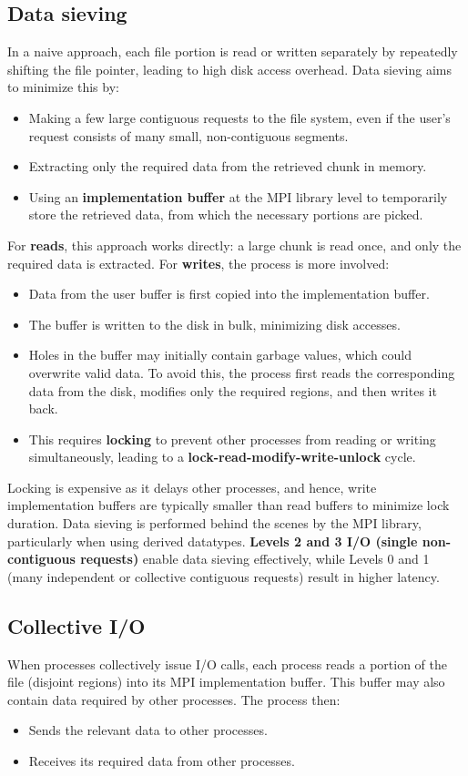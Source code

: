 \documentclass[12pt]{book}
\begin{document}
\subsection{Data sieving}
In a naive approach, each file portion is read or written separately by repeatedly shifting the file pointer, leading to high disk access overhead. Data sieving aims to minimize this by:
\begin{itemize}
    \item Making a few large contiguous requests to the file system, even if the user's request consists of many small, non-contiguous segments.
    \item Extracting only the required data from the retrieved chunk in memory.
    \item Using an \textbf{implementation buffer} at the MPI library level to temporarily store the retrieved data, from which the necessary portions are picked.
\end{itemize}

For \textbf{reads}, this approach works directly: a large chunk is read once, and only the required data is extracted.  
For \textbf{writes}, the process is more involved:
\begin{itemize}
    \item Data from the user buffer is first copied into the implementation buffer.
    \item The buffer is written to the disk in bulk, minimizing disk accesses.
    \item Holes in the buffer may initially contain garbage values, which could overwrite valid data. To avoid this, the process first reads the corresponding data from the disk, modifies only the required regions, and then writes it back.
    \item This requires \textbf{locking} to prevent other processes from reading or writing simultaneously, leading to a \textbf{lock-read-modify-write-unlock} cycle.
\end{itemize}

Locking is expensive as it delays other processes, and hence, write implementation buffers are typically smaller than read buffers to minimize lock duration. Data sieving is performed behind the scenes by the MPI library, particularly when using derived datatypes.  
\textbf{Levels 2 and 3 I/O (single non-contiguous requests)} enable data sieving effectively, while Levels 0 and 1 (many independent or collective contiguous requests) result in higher latency.

\subsection{Collective I/O}
When processes collectively issue I/O calls, each process reads a portion of the file (disjoint regions) into its MPI implementation buffer. This buffer may also contain data required by other processes. The process then:
\begin{itemize}
    \item Sends the relevant data to other processes.
    \item Receives its required data from other processes.
\end{itemize}
\end{document}
